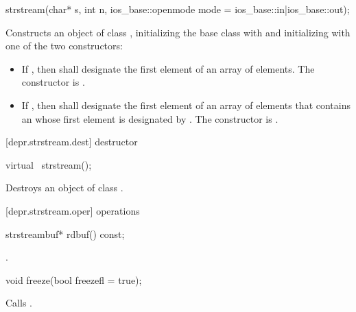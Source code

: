 %
\begin{itemdecl}
strstream(char* s, int n,
          ios_base::openmode mode = ios_base::in|ios_base::out);
\end{itemdecl}

\begin{itemdescr}
\pnum
\effects
Constructs an object of class
,
initializing the base class with
and initializing  with one of the two constructors:
\begin{itemize}
\item
If
,
then  shall designate the first element of an array of  elements.
The constructor is
.
\item
If
,
then  shall
designate the first element of an array of  elements that contains
an \ntbs{} whose first element is designated by .
The constructor is
.
%
\end{itemize}
\end{itemdescr}

[depr.strstream.dest]{ destructor}

%
\begin{itemdecl}
virtual ~strstream();
\end{itemdecl}

\begin{itemdescr}
\pnum
\effects
Destroys an object of class
.
\end{itemdescr}

[depr.strstream.oper]{ operations}

%
\begin{itemdecl}
strstreambuf* rdbuf() const;
\end{itemdecl}

\begin{itemdescr}
\pnum
\returns
{}.
\end{itemdescr}

%
\begin{itemdecl}
void freeze(bool freezefl = true);
\end{itemdecl}

\begin{itemdescr}
\pnum
\effects
Calls
.
\end{itemdescr}

